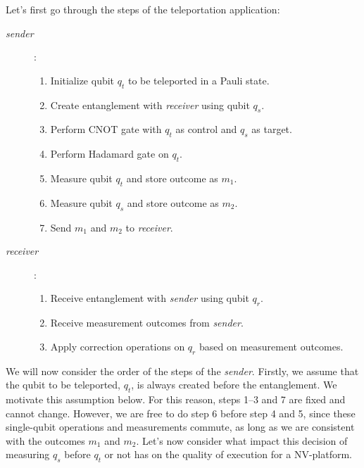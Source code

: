 Let's first go through the steps of the teleportation application:\newline
\begin{description}
  \item[\textit{sender}]:
        \begin{enumerate}
          \item Initialize qubit $q_t$ to be teleported in a Pauli state.
          \item Create entanglement with \textit{receiver} using qubit $q_s$.
          \item Perform CNOT gate with $q_t$ as control and $q_s$ as target.
          \item Perform Hadamard gate on $q_t$.
          \item Measure qubit $q_t$ and store outcome as $m_1$.
          \item Measure qubit $q_s$ and store outcome as $m_2$.
          \item Send $m_1$ and $m_2$ to \textit{receiver}.
        \end{enumerate}
  \item[\textit{receiver}]:
        \begin{enumerate}
          \item Receive entanglement with \textit{sender} using qubit $q_r$.
          \item Receive measurement outcomes from \textit{sender}.
          \item Apply correction operations on $q_r$ based on measurement outcomes.
        \end{enumerate}
\end{description}

We will now consider the order of the steps of the \textit{sender}.
Firstly, we assume that the qubit to be teleported, $q_t$, is always created before the entanglement.
We motivate this assumption below. For this reason, steps 1--3 and 7 are fixed and cannot change.
However, we are free to do step 6 before step 4 and 5, since these single-qubit operations and measurements commute, as long as we are consistent with the outcomes $m_1$ and $m_2$.
Let's now consider what impact this decision of measuring $q_s$ before $q_t$ or not has on the quality of execution for a NV-platform.

